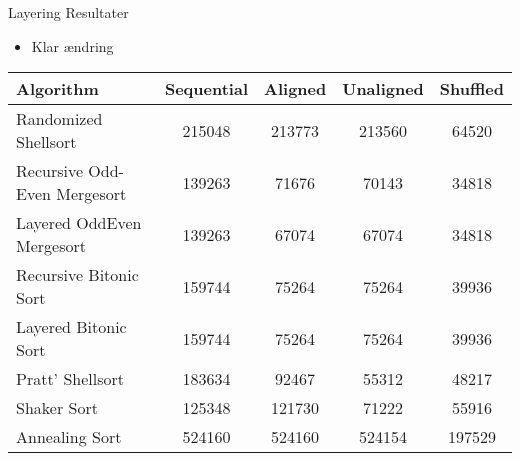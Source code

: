 \begin{frame}{Layering Resultater}
	\begin{itemize}
		\item Klar ændring
	\end{itemize}
	\scriptsize
	\begin{tabular}{|l c c c c|}
\hline
Algorithm & Sequential & Aligned & Unaligned & Shuffled \\
\hline
Randomized Shellsort & 215048 & 213773 & 213560 & 64520\\

Recursive Odd-Even Mergesort & 139263 & 71676 & 70143 & 34818\\

Layered OddEven Mergesort & 139263 & 67074 & 67074 & 34818\\

Recursive Bitonic Sort & 159744 & 75264 & 75264 & 39936\\

Layered Bitonic Sort & 159744 & 75264 & 75264 & 39936\\

Pratt' Shellsort & 183634 & 92467 & 55312 & 48217\\

Shaker Sort & 125348 & 121730 & 71222 & 55916\\

Annealing Sort & 524160 & 524160 & 524154 & 197529\\
\hline
\end{tabular}
\end{frame}